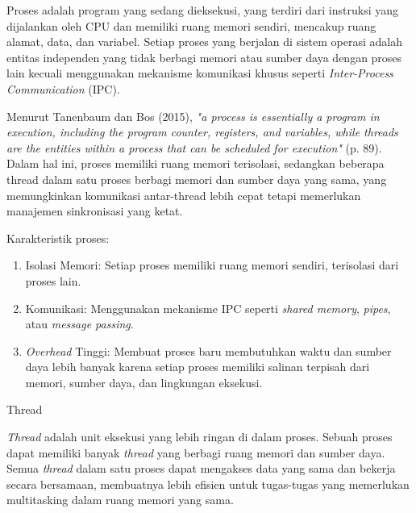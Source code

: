 \documentclass[12pt]{article}
\begin{document}
            Proses adalah program yang sedang dieksekusi, yang terdiri dari instruksi yang dijalankan oleh CPU dan memiliki ruang memori sendiri, mencakup ruang alamat, data, dan variabel. Setiap proses yang berjalan di sistem operasi adalah entitas independen yang tidak berbagi memori atau sumber daya dengan proses lain kecuali menggunakan mekanisme komunikasi khusus seperti \textit{Inter-Process Communication} (IPC). 

            Menurut Tanenbaum dan Bos (2015), \textit{"a process is essentially a program in execution, including the program counter, registers, and variables, while threads are the entities within a process that can be scheduled for execution"} (p. 89). Dalam hal ini, proses memiliki ruang memori terisolasi, sedangkan beberapa thread dalam satu proses berbagi memori dan sumber daya yang sama, yang memungkinkan komunikasi antar-thread lebih cepat tetapi memerlukan manajemen sinkronisasi yang ketat.

            Karakteristik proses:
            \begin{enumerate}
                \item Isolasi Memori: Setiap proses memiliki ruang memori sendiri, terisolasi dari proses lain.
                \item Komunikasi: Menggunakan mekanisme IPC seperti \textit{shared memory}, \textit{pipes}, atau \textit{message passing}.
                \item \textit{Overhead} Tinggi: Membuat proses baru membutuhkan waktu dan sumber daya lebih banyak karena setiap proses memiliki salinan terpisah dari memori, sumber daya, dan lingkungan eksekusi.
            \end{enumerate}
      \item Thread

            \textit{Thread} adalah unit eksekusi yang lebih ringan di dalam proses. Sebuah proses dapat memiliki banyak \textit{thread} yang berbagi ruang memori dan sumber daya. Semua \textit{thread} dalam satu proses dapat mengakses data yang sama dan bekerja secara bersamaan, membuatnya lebih efisien untuk tugas-tugas yang memerlukan multitasking dalam ruang memori yang sama.
\end{document}
